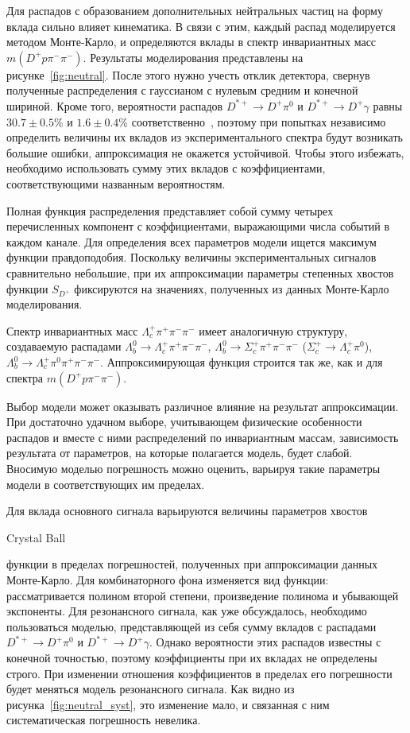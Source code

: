 \documentclass[a4paper, 12pt]{article}
\def\eng#1{
\unskip
\begin{otherlanguage}{english}
#1
\end{otherlanguage}
}
\def\Lb{\varLambda_b^0}
\def\Lc{\varLambda_c^+}
\def\Dp{D^+}
\def\Dsp{D^{*+}}
\def\pim{\pi^-}
\def\pip{\pi^+}
\def\piz{\pi^0}
\begin{document}
Для распадов с образованием дополнительных нейтральных частиц на форму вклада сильно влияет кинематика. 
В связи с этим, каждый распад моделируется методом Монте-Карло, и определяются вклады в спектр инвариантных масс $m(\Dp p\pim\pim)$. Результаты моделирования представлены на рисунке~\ref{fig:neutral}.
После этого нужно учесть отклик детектора, свернув полученные распределения с гауссианом с нулевым средним и конечной шириной. 
Кроме того, вероятности распадов $\Dsp\to\Dp\piz$ и $\Dsp\to\Dp\gamma$ равны $30.7\pm0.5$\% и $1.6\pm0.4$\% соответственно~\cite{PDG},  
поэтому при попытках независимо определить величины их вкладов из экспериментального спектра будут возникать большие ошибки, аппроксимация не окажется устойчивой. 
Чтобы этого избежать, необходимо использовать сумму этих вкладов с коэффициентами, соответствующими названным вероятностям. 

Полная функция распределения представляет собой сумму четырех перечисленных компонент с коэффициентами, выражающими числа событий в каждом канале. 
Для определения всех параметров модели ищется максимум функции правдоподобия. 
Поскольку величины экспериментальных сигналов сравнительно небольшие, при их аппроксимации параметры степенных хвостов функции $S_{\Dp}$ фиксируются на значениях, полученных из данных Монте-Карло моделирования. 

Спектр инвариантных масс $\Lc\pip\pim\pim$ имеет аналогичную структуру, создаваемую распадами $\Lb\to\Lc\pip\pim\pim$, $\Lb\to\varSigma_c^+\pip\pim\pim$ ($\varSigma_c^+\to\Lc\piz$), $\Lb\to\Lc\piz\pip\pim\pim$. 
Аппроксимирующая функция строится так же, как и для спектра $m(\Dp p\pim\pim)$.

Выбор модели может оказывать различное влияние на результат аппроксимации. 
При достаточно удачном выборе, учитывающем физические особенности распадов и вместе с ними распределений по инвариантным массам, зависимость результата от параметров, на которые полагается модель, будет слабой. 
Вносимую моделью погрешность можно оценить, варьируя такие параметры модели в соответствующих им пределах. 

Для вклада основного сигнала варьируются величины параметров хвостов \eng{Crystal Ball} функции в пределах погрешностей, полученных при аппроксимации данных Монте-Карло. 
Для комбинаторного фона изменяется вид функции: рассматривается полином второй степени, произведение полинома и убывающей экспоненты. 
Для резонансного сигнала, как уже обсуждалось, необходимо пользоваться моделью, представляющей из себя сумму вкладов с распадами $\Dsp\to\Dp\piz$ и $\Dsp\to\Dp\gamma$. 
Однако вероятности этих распадов известны с конечной точностью, поэтому коэффициенты при их вкладах не определены строго. 
При изменении отношения коэффициентов в пределах его погрешности будет меняться модель резонансного сигнала. 
Как видно из рисунка~\ref{fig:neutral_syst}, это изменение мало, и связанная с ним систематическая погрешность невелика.
\end{document}
